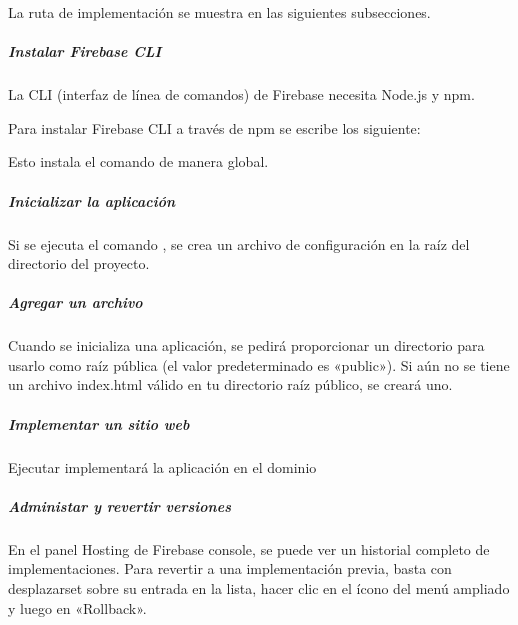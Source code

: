 La ruta de implementación se muestra en las siguientes subsecciones.


\subparagraph{Instalar Firebase CLI}
\label{\detokenize{firebase_web:instalar-firebase-cli}}
La CLI (interfaz de línea de comandos) de Firebase necesita Node.js y npm.

Para instalar Firebase CLI a través de npm se escribe los siguiente:

%
\begin{sphinxVerbatim}[commandchars=\\\{\}]
   
\end{sphinxVerbatim}

Esto instala el comando  de manera global.


\subparagraph{Inicializar la aplicación}
\label{\detokenize{firebase_web:inicializar-la-aplicacion}}
Si se ejecuta el comando , se crea un archivo de configuración
 en la raíz del directorio del proyecto.


\subparagraph{Agregar un archivo}
\label{\detokenize{firebase_web:agregar-un-archivo}}
Cuando se inicializa una aplicación, se pedirá proporcionar un directorio para
usarlo como raíz pública (el valor predeterminado es «public»). Si aún no
se tiene un archivo index.html válido en tu directorio raíz público, se creará
uno.


\subparagraph{Implementar un sitio web}
\label{\detokenize{firebase_web:implementar-un-sitio-web}}
Ejecutar  implementará la aplicación en el dominio


\subparagraph{Administar y revertir versiones}
\label{\detokenize{firebase_web:administar-y-revertir-versiones}}
En el panel Hosting de Firebase console, se puede ver un historial completo de
implementaciones. Para revertir a una implementación previa, basta con
desplazarset sobre su entrada en la lista, hacer clic en el ícono del menú
ampliado y luego en «Rollback».


